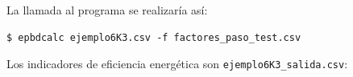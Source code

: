 \documentclass[10pt,notitlepage,oneside,a4paper]{article}
\begin{document}

La llamada al programa se realizaría así:

\begin{Verbatim}[fontsize=\small]
    $ epbdcalc ejemplo6K3.csv -f factores_paso_test.csv
\end{Verbatim}

Los indicadores de eficiencia energética son \texttt{ejemplo6K3\_salida.csv}:

\end{document}
